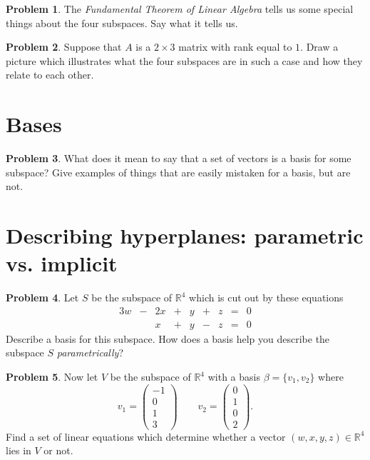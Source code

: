 \documentclass[11pt]{amsart}
\theoremstyle{definition}
\newtheorem{problem}{Problem}[section]
\begin{document}
\begin{problem}
The \emph{Fundamental Theorem of Linear Algebra} tells us some special things about the four subspaces. Say what it tells us.
\end{problem}


\begin{problem}
Suppose that $A$ is a $2\times 3$ matrix with rank equal to $1$. Draw a picture which illustrates what the four subspaces are in such a case and how they relate to each other.
\end{problem}


\vspace{1cm}
\section{Bases}

\begin{problem}
What does it mean to say that a set of vectors is a basis for some subspace?
Give examples of things that are easily mistaken for a basis, but are not.
\end{problem}


\vspace{1cm}
\section{Describing hyperplanes: parametric vs. implicit}

\begin{problem}
Let $S$ be the subspace of $\mathbb{R}^4$ which is cut out by these equations
\[
\begin{array}{rrrrrrrrr}
3w & -& 2x & + & y & + & z & = & 0 \\
   &  & x  & + & y & - & z & = & 0
\end{array}
\]
Describe a basis for this subspace. How does a basis help you describe the subspace $S$ \emph{parametrically}?
\end{problem}


\begin{problem}
Now let $V$ be the subspace of $\mathbb{R}^4$ with a basis $\beta = \{ v_1, v_2 \}$ where
\[
v_1 = \begin{pmatrix} -1\\ 0 \\ 1 \\ 3 \end{pmatrix} \qquad v_2 = \begin{pmatrix} 0 \\ 1 \\ 0 \\ 2 \end{pmatrix}.
\]
Find a set of linear equations which determine whether a vector $(w,x,y,z) \in \mathbb{R}^4$ lies in $V$ or not.
\end{problem}
\end{document}
